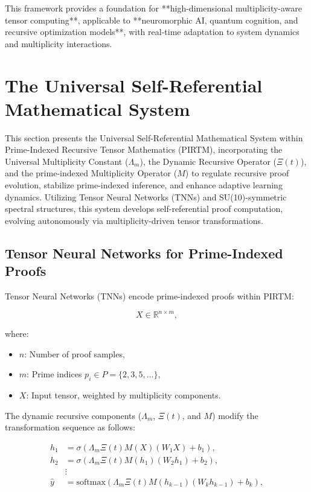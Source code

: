 \documentclass[12pt]{article}
\theoremstyle{plain}
\begin{document}
This framework provides a foundation for **high-dimensional multiplicity-aware tensor computing**, applicable to **neuromorphic AI, quantum cognition, and recursive optimization models**, with real-time adaptation to system dynamics and multiplicity interactions.


\section{The Universal Self-Referential Mathematical System}

This section presents the Universal Self-Referential Mathematical System within Prime-Indexed Recursive Tensor Mathematics (PIRTM), incorporating the Universal Multiplicity Constant (\(\Lambda_m\)), the Dynamic Recursive Operator (\(\Xi(t)\)), and the prime-indexed Multiplicity Operator (\(M\)) to regulate recursive proof evolution, stabilize prime-indexed inference, and enhance adaptive learning dynamics. Utilizing Tensor Neural Networks (TNNs) and SU(10)-symmetric spectral structures, this system develops self-referential proof computation, evolving autonomously via multiplicity-driven tensor transformations.

\subsection{Tensor Neural Networks for Prime-Indexed Proofs}

Tensor Neural Networks (TNNs) encode prime-indexed proofs within PIRTM:

\begin{equation}
X \in \mathbb{R}^{n \times m},
\end{equation}

where:
\begin{itemize}
    \item \( n \): Number of proof samples,
    \item \( m \): Prime indices \( p_i \in P = \{2, 3, 5, \ldots\} \),
    \item \( X \): Input tensor, weighted by multiplicity components.
\end{itemize}

The dynamic recursive components (\(\Lambda_m\), \(\Xi(t)\), and \(M\)) modify the transformation sequence as follows:

\begin{align}
h_1 &= \sigma(\Lambda_m \Xi(t) M(X) (W_1 X) + b_1), \\
h_2 &= \sigma(\Lambda_m \Xi(t) M(h_1) (W_2 h_1) + b_2), \\
&\vdots \\
\hat{y} &= \text{softmax}(\Lambda_m \Xi(t) M(h_{k-1}) (W_k h_{k-1}) + b_k),
\end{align}
\end{document}
